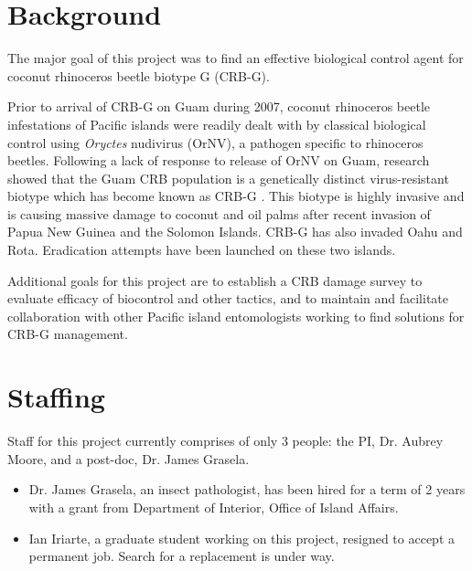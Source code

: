\documentclass[12pt,letterpaper,english,bibliography=totocnumbered]{scrartcl}
\begin{document}
\newpage
\tableofcontents{}

\newpage

\section{Background}

The major goal of this project was to find an effective biological
control agent for coconut rhinoceros beetle biotype G (CRB-G).

Prior to arrival of CRB-G on Guam during 2007, coconut rhinoceros beetle
infestations of Pacific islands were readily dealt with by classical
biological control using \textit{Oryctes} nudivirus (OrNV), a pathogen specific to rhinoceros beetles. 
Following a lack
of response to release of OrNV on Guam, research showed that the Guam
CRB population is a genetically distinct virus-resistant biotype which
has become known as CRB-G \cite{marshall_new_2017-1}. This biotype is highly invasive and is
causing massive damage to coconut and oil palms after recent invasion of Papua New Guinea
and the Solomon Islands. CRB-G has also invaded Oahu and Rota. Eradication
attempts have been launched on these two islands.

Additional goals for this project are to establish a CRB damage survey to evaluate efficacy of biocontrol and other tactics, and to maintain and facilitate collaboration with other Pacific island entomologists working to find solutions for CRB-G management.


\section{Staffing}

Staff for this project currently comprises of only 3 people: the PI, Dr. Aubrey Moore, and a post-doc, Dr. James Grasela.
\begin{itemize}

    \item Dr. James Grasela, an insect pathologist, has been hired for a term of 2 years with a grant from Department of Interior, Office of Island Affairs.

    \item Ian Iriarte, a graduate student working on this project, resigned to accept a permanent job. Search for a replacement is under way.

\end{itemize}

\clearpage
\end{document}
